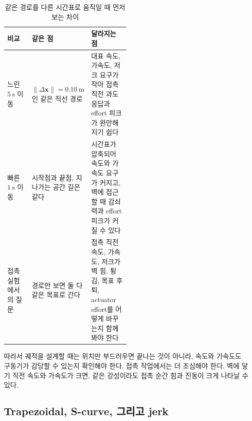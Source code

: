 \begin{table}[!htbp]
  \centering
  \caption{같은 경로를 다른 시간표로 움직일 때 먼저 보는 차이}
  \label{tab:same-path-different-timing}
  \small
  \setlength{\tabcolsep}{4pt}
  \renewcommand{\arraystretch}{1.12}
  \begin{tabularx}{\linewidth}{@{}>{\raggedright\arraybackslash}p{0.20\linewidth}>{\raggedright\arraybackslash}p{0.30\linewidth}>{\raggedright\arraybackslash}X@{}}
    \toprule
    비교 & 같은 점 & 달라지는 점 \\
    \midrule
    느린 \(5~\mathrm{s}\) 이동 & \(\|\Delta\bm{x}\|=0.10~\mathrm{m}\)인 같은 직선 경로 & 대표 속도, 가속도, 저크 요구가 작아 접촉 직전 과도응답과 effort 피크가 완만해지기 쉽다 \\
    빠른 \(1~\mathrm{s}\) 이동 & 시작점과 끝점, 지나가는 공간 길은 같다 & 시간표가 압축되어 속도와 가속도 요구가 커지고, 벽에 접근할 때 감쇠력과 effort 피크가 커질 수 있다 \\
    접촉 실험에서의 질문 & 경로만 보면 둘 다 같은 목표로 간다 & 접촉 직전 속도, 가속도, 저크가 벽 힘, 튕김, 목표 후퇴, actuator effort를 어떻게 바꾸는지 함께 봐야 한다 \\
    \bottomrule
  \end{tabularx}
\end{table}

따라서 궤적을 설계할 때는 위치만 부드러우면 끝나는 것이 아니라, 속도와 가속도도 구동기가 감당할 수 있는지 확인해야 한다.
접촉 작업에서는 더 조심해야 한다.
벽에 닿기 직전 속도와 가속도가 크면, 같은 강성이라도 접촉 순간 힘과 진동이 크게 나타날 수 있다.

\subsection{Trapezoidal, S-curve, 그리고 jerk}
\label{sec:robotics-trajectory-profiles}

